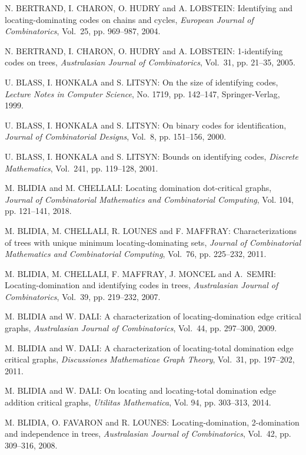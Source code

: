 \begin{thebibliography}{999}
N. BERTRAND, I. CHARON, O. HUDRY and A. LOBSTEIN: Identifying and locating-dominating codes on chains and cycles, {\it European Journal of Combinatorics}, Vol.~25, pp. 969--987, 2004.

N. BERTRAND, I. CHARON, O. HUDRY and A. LOBSTEIN: 1-identifying codes on trees, {\it Australasian Journal of Combinatorics}, Vol.~31, pp. 21--35, 2005.

U. BLASS, I. HONKALA and S. LITSYN: On the size of identifying codes, {\it Lecture Notes in Computer Science}, No. 1719, pp. 142--147, Springer-Verlag, 1999.

U. BLASS, I. HONKALA and S. LITSYN: On binary codes for identification, {\it Journal of Combinatorial Designs}, Vol.~8, pp. 151--156, 2000.

U. BLASS, I. HONKALA and S. LITSYN: Bounds on identifying codes, {\it Discrete Mathematics}, Vol.~241, pp. 119--128, 2001.

M. BLIDIA and M. CHELLALI: Locating domination dot-critical graphs, {\it Journal of Combinatorial Mathematics and Combinatorial Computing}, Vol. 104, pp. 121--141, 2018.

M. BLIDIA, M. CHELLALI, R. LOUNES and F. MAFFRAY: Characterizations of trees with unique minimum locating-dominating sets, {\it Journal of Combinatorial Mathematics and Combinatorial Computing}, Vol.~76, pp. 225--232, 2011.

M. BLIDIA, M. CHELLALI, F. MAFFRAY, J. MONCEL and A.~SEMRI: Locating-domination and identifying codes in trees, {\it Australasian Journal of Combinatorics}, Vol.~39, pp. 219--232, 2007.

M. BLIDIA and W. DALI: A characterization of locating-domination edge critical graphs, {\it Australasian Journal of Combinatorics}, Vol.~44, pp. 297--300, 2009.

M. BLIDIA and W. DALI: A characterization of locating-total domination edge critical graphs, {\it Discussiones Mathematicae Graph Theory}, Vol.~31, pp. 197--202, 2011.

M. BLIDIA and W. DALI:
On locating and locating-total domination edge addition critical graphs,
{\it Utilitas Mathematica}, Vol. 94, pp. 303--313, 2014.

M. BLIDIA, O. FAVARON and R. LOUNES: Locating-domination, 2-domination and
independence in trees, {\it Australasian Journal of Combinatorics}, Vol.~42, pp.
309--316, 2008. 


\end{thebibliography}
